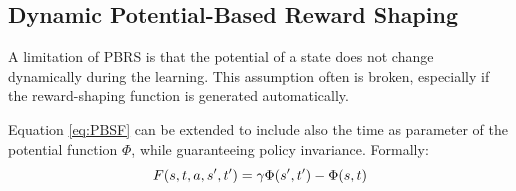 



\subsection{Dynamic Potential-Based Reward Shaping}\label{sect:DPBRS}
A limitation of PBRS  is that  the  potential  of  a  state  does  not  change  dynamically
during the learning.  This assumption often is broken, especially if the reward-shaping function is generated automatically.
  
Equation \ref{eq:PBSF} can be extended to include also the time as parameter of the potential function $\Phi$, while guaranteeing policy invariance. Formally:
\begin{equation}\label{eq:DPBSF}
F(s, t, a, s', t') = \gamma\Phi(s', t') - \Phi(s, t)
\end{equation}

